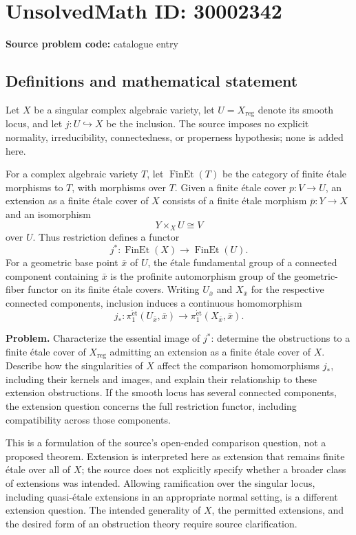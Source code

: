 \documentclass[11pt]{article}
\begin{document}
\section*{UnsolvedMath ID: 30002342}
\textbf{Source problem code:} catalogue entry
\subsection{Definitions and mathematical statement}
Let \(X\) be a singular complex algebraic variety, let \(U=X_{\mathrm{reg}}\) denote its smooth locus, and let \(j:U\hookrightarrow X\) be the inclusion. The source imposes no explicit normality, irreducibility, connectedness, or properness hypothesis; none is added here.

For a complex algebraic variety \(T\), let \(\operatorname{FinEt}(T)\) be the category of finite étale morphisms to \(T\), with morphisms over \(T\). Given a finite étale cover \(p:V\to U\), an extension as a finite étale cover of \(X\) consists of a finite étale morphism \(\overline p:Y\to X\) and an isomorphism
\[
Y\times_X U\cong V
\]
over \(U\). Thus restriction defines a functor
\[
j^*:\operatorname{FinEt}(X)\longrightarrow\operatorname{FinEt}(U).
\]
For a geometric base point \(\bar x\) of \(U\), the étale fundamental group of a connected component containing \(\bar x\) is the profinite automorphism group of the geometric-fiber functor on its finite étale covers. Writing \(U_{\bar x}\) and \(X_{\bar x}\) for the respective connected components, inclusion induces a continuous homomorphism
\[
j_*:\pi_1^{\mathrm{\acute et}}(U_{\bar x},\bar x)
\longrightarrow
\pi_1^{\mathrm{\acute et}}(X_{\bar x},\bar x).
\]

\textbf{Problem.} Characterize the essential image of \(j^*\): determine the obstructions to a finite étale cover of \(X_{\mathrm{reg}}\) admitting an extension as a finite étale cover of \(X\). Describe how the singularities of \(X\) affect the comparison homomorphisms \(j_*\), including their kernels and images, and explain their relationship to these extension obstructions. If the smooth locus has several connected components, the extension question concerns the full restriction functor, including compatibility across those components.

This is a formulation of the source's open-ended comparison question, not a proposed theorem. Extension is interpreted here as extension that remains finite étale over all of \(X\); the source does not explicitly specify whether a broader class of extensions was intended. Allowing ramification over the singular locus, including quasi-étale extensions in an appropriate normal setting, is a different extension question. The intended generality of \(X\), the permitted extensions, and the desired form of an obstruction theory require source clarification.
\end{document}
